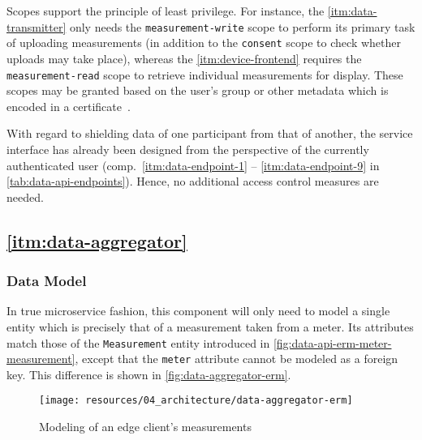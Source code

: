 \begin{description}
\FloatBarrier

	Scopes support the principle of least privilege. For instance, the \ref{itm:data-transmitter} only needs the \texttt{measurement-write} scope to perform its primary task of uploading measurements (in addition to the \texttt{consent} scope to check whether uploads may take place), whereas the \ref{itm:device-frontend} requires the \texttt{measurement-read} scope to retrieve individual measurements for display. These scopes may be granted based on the user's group or other metadata which is encoded in a certificate~\cite[p.~1]{butt2004certificate}.
\FloatBarrier

\end{description}

With regard to shielding data of one participant from that of another, the service interface has already been designed from the perspective of the currently authenticated user (comp.~\ref{itm:data-endpoint-1} -- \ref{itm:data-endpoint-9} in \autoref{tab:data-api-endpoints}). Hence, no additional access control measures are needed.


\subsection{\ref*{itm:data-aggregator}}
\label{sec:component-specification-data-aggregator}

\subsubsection{Data Model}
\label{sec:data-aggregator-data-model}

In true microservice fashion, this component will only need to model a single entity which is precisely that of a measurement taken from a meter. Its attributes match those of the \texttt{Measurement} entity introduced in \autoref{fig:data-api-erm-meter-measurement}, except that the \texttt{meter} attribute cannot be modeled as a foreign key. This difference is shown in \autoref{fig:data-aggregator-erm}.

\begin{figure}[hbt]
  \centering
  \texttt{[image: resources/04\_architecture/data-aggregator-erm]}
  \caption{Modeling of an edge client's measurements}
  \label{fig:data-aggregator-erm}
\end{figure}

